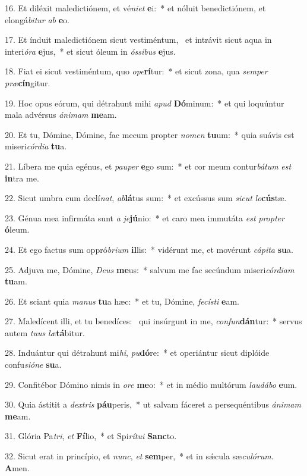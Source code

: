 16. Et diléxit maledictiónem, et vé\textit{ni}\textit{et} \textbf{e}i:~*  et nóluit benedictiónem, et elongá\textit{bi}\textit{tur} \textit{ab} \textbf{e}o.\

17. Et índuit maledictiónem sicut vestiméntum, \dag\  et intrávit sicut aqua in interi\textit{ó}\textit{ra} \textbf{e}jus,~*  et sicut óleum in \textit{ós}\textit{si}\textit{bus} \textbf{e}jus.\

18. Fiat ei sicut vestiméntum, quo \textit{o}\textit{pe}\textbf{rí}tur:~*  et sicut zona, qua \textit{sem}\textit{per} \textit{præ}\textbf{cín}gitur.\

19. Hoc opus eórum, qui détrahunt mihi \textit{a}\textit{pud} \textbf{Dó}minum:~*  et qui loquúntur mala advérsus \textit{á}\textit{ni}\textit{mam} \textbf{me}am.\

20. Et tu, Dómine, Dómine, fac mecum propter \textit{no}\textit{men} \textbf{tu}um:~*  quia suávis est miseri\textit{cór}\textit{di}\textit{a} \textbf{tu}a.\

21. Líbera me quia egénus, et \textit{pau}\textit{per} \textbf{e}go sum:~*  et cor meum contur\textit{bá}\textit{tum} \textit{est} \textbf{in}tra me.\

22. Sicut umbra cum declí\textit{nat}, \textit{ab}\textbf{lá}tus sum:~*  et excússus sum \textit{sic}\textit{ut} \textit{lo}\textbf{cús}tæ.\

23. Génua mea infirmáta sunt \textit{a} \textit{je}\textbf{jú}nio:~*  et caro mea immutáta \textit{est} \textit{prop}\textit{ter} \textbf{ó}leum.\

24. Et ego factus sum oppró\textit{bri}\textit{um} \textbf{il}lis:~*  vidérunt me, et movérunt \textit{cá}\textit{pi}\textit{ta} \textbf{su}a.\

25. Adjuva me, Dómine, \textit{De}\textit{us} \textbf{me}us:~*  salvum me fac secúndum miseri\textit{cór}\textit{di}\textit{am} \textbf{tu}am.\

26. Et sciant quia \textit{ma}\textit{nus} \textbf{tu}a hæc:~*  et tu, Dómine, \textit{fe}\textit{cís}\textit{ti} \textbf{e}am.\

27. Maledícent illi, et tu benedíces: \dag\  qui insúrgunt in me, \textit{con}\textit{fun}\textbf{dán}tur:~*  servus autem \textit{tu}\textit{us} \textit{læ}\textbf{tá}bitur.\

28. Induántur qui détrahunt mi\textit{hi}, \textit{pu}\textbf{dó}re:~*  et operiántur sicut diplóide confu\textit{si}\textit{ó}\textit{ne} \textbf{su}a.\

29. Confitébor Dómino nimis in \textit{o}\textit{re} \textbf{me}o:~*  et in médio multórum \textit{lau}\textit{dá}\textit{bo} \textbf{e}um.\

30. Quia ástitit a \textit{dex}\textit{tris} \textbf{páu}peris,~*  ut salvam fáceret a persequéntibus \textit{á}\textit{ni}\textit{mam} \textbf{me}am.\

31. Glória Pa\textit{tri}, \textit{et} \textbf{Fí}lio,~*  et Spi\textit{rí}\textit{tu}\textit{i} \textbf{Sanc}to.\

32. Sicut erat in princípio, et \textit{nunc}, \textit{et} \textbf{sem}per,~*  et in sǽcula sæ\textit{cu}\textit{ló}\textit{rum}. \textbf{A}men.\

